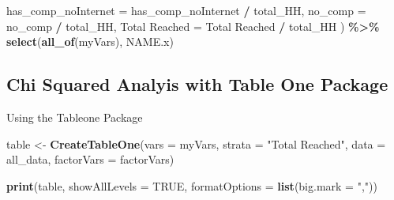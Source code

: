 \documentclass[
]{article}
\newenvironment{Shaded}{\begin{snugshade}}{\end{snugshade}}
\newcommand{\DataTypeTok}[1]{\textcolor[rgb]{0.13,0.29,0.53}{#1}}
\newcommand{\KeywordTok}[1]{\textcolor[rgb]{0.13,0.29,0.53}{\textbf{#1}}}
\newcommand{\NormalTok}[1]{#1}
\newcommand{\OperatorTok}[1]{\textcolor[rgb]{0.81,0.36,0.00}{\textbf{#1}}}
\newcommand{\OtherTok}[1]{\textcolor[rgb]{0.56,0.35,0.01}{#1}}
\newcommand{\StringTok}[1]{\textcolor[rgb]{0.31,0.60,0.02}{#1}}
\begin{document}
\begin{Shaded}
\begin{Highlighting}[]
    \DataTypeTok{has\_comp\_noInternet =}\NormalTok{ has\_comp\_noInternet }\OperatorTok{/}\StringTok{ }\NormalTok{total\_HH, }
    \DataTypeTok{no\_comp =}\NormalTok{ no\_comp }\OperatorTok{/}\StringTok{ }\NormalTok{total\_HH, }
    \StringTok{\textasciigrave{}}\DataTypeTok{Total Reached}\StringTok{\textasciigrave{}}\NormalTok{ =}\StringTok{ \textasciigrave{}}\DataTypeTok{Total Reached}\StringTok{\textasciigrave{}} \OperatorTok{/}\StringTok{ }\NormalTok{total\_HH }
\NormalTok{  ) }\OperatorTok{\%\textgreater{}\%}\StringTok{ }
\StringTok{  }\KeywordTok{select}\NormalTok{(}\KeywordTok{all\_of}\NormalTok{(myVars), NAME.x)}
\end{Highlighting}
\end{Shaded}

\hypertarget{chi-squared-analyis-with-table-one-package}{%
\subsection{Chi Squared Analyis with Table One
Package}\label{chi-squared-analyis-with-table-one-package}}

Using the Tableone Package

\begin{Shaded}
\begin{Highlighting}[]
\NormalTok{table \textless{}{-}}\StringTok{ }\KeywordTok{CreateTableOne}\NormalTok{(}\DataTypeTok{vars =}\NormalTok{ myVars, }\DataTypeTok{strata =} \StringTok{"Total Reached"}\NormalTok{, }\DataTypeTok{data =}\NormalTok{ all\_data, }\DataTypeTok{factorVars =}\NormalTok{ factorVars)}


\KeywordTok{print}\NormalTok{(table, }\DataTypeTok{showAllLevels =} \OtherTok{TRUE}\NormalTok{, }\DataTypeTok{formatOptions =} \KeywordTok{list}\NormalTok{(}\DataTypeTok{big.mark =} \StringTok{","}\NormalTok{))}
\end{Highlighting}
\end{Shaded}
\end{document}
